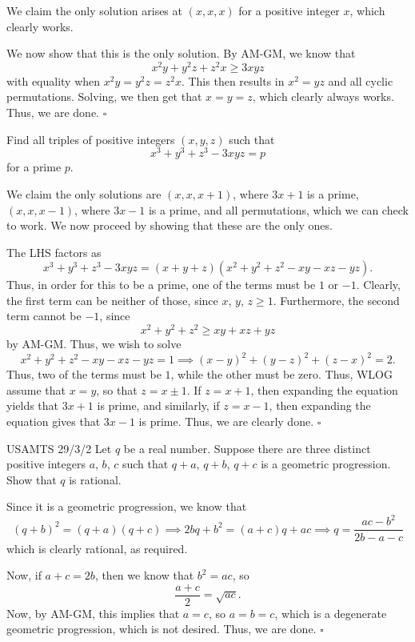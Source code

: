 \documentclass{article}
\begin{document}
We claim the only solution arises at $(x, x, x)$ for a positive integer $x$, which clearly works.

We now show that this is the only solution. By AM-GM, we know that \[x^2y+y^2z+z^2x \ge 3xyz\] with equality when $x^2y = y^2z = z^2x$. This then results in $x^2 = yz$ and all cyclic permutations. Solving, we then get that $x = y = z$, which clearly always works. Thus, we are done. $\square$

\begin{problem}[4.9.2]{}
Find all triples of positive integers $(x, y, z)$ such that \[x^3+y^3+z^3-3xyz = p\] for a prime $p$.
\end{problem}

We claim the only solutions are $(x, x, x+1)$, where $3x+1$ is a prime, $(x, x, x-1)$, where $3x-1$ is a prime, and all permutations, which we can check to work. We now proceed by showing that these are the only ones.

The LHS factors as \[x^3+y^3+z^3-3xyz = (x+y+z)(x^2+y^2+z^2-xy-xz-yz).\] Thus, in order for this to be a prime, one of the terms must be $1$ or $-1$. Clearly, the first term can be neither of those, since $x$, $y$, $z \ge 1$. Furthermore, the second term cannot be $-1$, since \[x^2+y^2+z^2 \ge xy+xz+yz\] by AM-GM. Thus, we wish to solve \[x^2+y^2+z^2-xy-xz-yz = 1 \implies (x-y)^2+(y-z)^2+(z-x)^2 = 2.\] Thus, two of the terms must be $1$, while the other must be zero. Thus, WLOG assume that $x = y$, so that $z = x \pm 1$. If $z = x+1$, then expanding the equation yields that $3x+1$ is prime, and similarly, if $z = x-1$, then expanding the equation gives that $3x-1$ is prime. Thus, we are clearly done. $\square$

\begin{problem}[4.9.3]{USAMTS 29/3/2}
Let $q$ be a real number. Suppose there are three distinct positive integers $a$, $b$, $c$ such that $q + a$, $q + b$, $q + c$ is a geometric progression. Show that $q$ is rational.
\end{problem}

Since it is a geometric progression, we know that \[(q+b)^2 = (q+a)(q+c) \implies 2bq+b^2 = (a+c)q+ac \implies q = \dfrac{ac-b^2}{2b-a-c}\] which is clearly rational, as required. 

Now, if $a+c = 2b$, then we know that $b^2 = ac$, so \[\dfrac{a+c}{2} = \sqrt{ac}.\] Now, by AM-GM, this implies that $a = c$, so $a = b = c$, which is a degenerate geometric progression, which is not desired. Thus, we are done. $\square$
\end{document}
